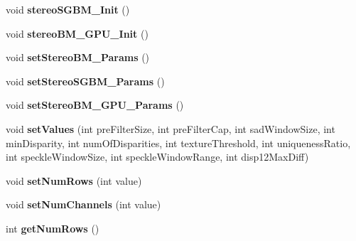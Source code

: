 \begin{DoxyCompactItemize}
\item 
void {\bfseries stereo\+S\+G\+B\+M\+\_\+\+Init} ()\hypertarget{class_stereo_processor_a27120807b020f1a1f3dab9f481172fc7}{}\label{class_stereo_processor_a27120807b020f1a1f3dab9f481172fc7}

\item 
void {\bfseries stereo\+B\+M\+\_\+\+G\+P\+U\+\_\+\+Init} ()\hypertarget{class_stereo_processor_aeffa85470ecc94865ce0943f4bf7920b}{}\label{class_stereo_processor_aeffa85470ecc94865ce0943f4bf7920b}

\item 
void {\bfseries set\+Stereo\+B\+M\+\_\+\+Params} ()\hypertarget{class_stereo_processor_a7544e7f43dfe9c90638b37800e3a7e86}{}\label{class_stereo_processor_a7544e7f43dfe9c90638b37800e3a7e86}

\item 
void {\bfseries set\+Stereo\+S\+G\+B\+M\+\_\+\+Params} ()\hypertarget{class_stereo_processor_a74da91a7bde48dd130b96a4c89b2cd6d}{}\label{class_stereo_processor_a74da91a7bde48dd130b96a4c89b2cd6d}

\item 
void {\bfseries set\+Stereo\+B\+M\+\_\+\+G\+P\+U\+\_\+\+Params} ()\hypertarget{class_stereo_processor_a65e413dd50eb5d08e7c2cf8552eabda9}{}\label{class_stereo_processor_a65e413dd50eb5d08e7c2cf8552eabda9}

\item 
void {\bfseries set\+Values} (int pre\+Filter\+Size, int pre\+Filter\+Cap, int sad\+Window\+Size, int min\+Disparity, int num\+Of\+Disparities, int texture\+Threshold, int uniqueness\+Ratio, int speckle\+Window\+Size, int speckle\+Window\+Range, int disp12\+Max\+Diff)\hypertarget{class_stereo_processor_a91a6b4bd83ca05386ce0c678f843344c}{}\label{class_stereo_processor_a91a6b4bd83ca05386ce0c678f843344c}

\item 
void {\bfseries set\+Num\+Rows} (int value)\hypertarget{class_stereo_processor_aac8a1975b0cb099516e14fca10db9ce3}{}\label{class_stereo_processor_aac8a1975b0cb099516e14fca10db9ce3}

\item 
void {\bfseries set\+Num\+Channels} (int value)\hypertarget{class_stereo_processor_a53ed33791c1d8ff5b7ea40cb06129d36}{}\label{class_stereo_processor_a53ed33791c1d8ff5b7ea40cb06129d36}

\item 
int {\bfseries get\+Num\+Rows} ()\hypertarget{class_stereo_processor_ac0d394ba023dd18613ad67cd635c954d}{}\label{class_stereo_processor_ac0d394ba023dd18613ad67cd635c954d}


\end{DoxyCompactItemize}
